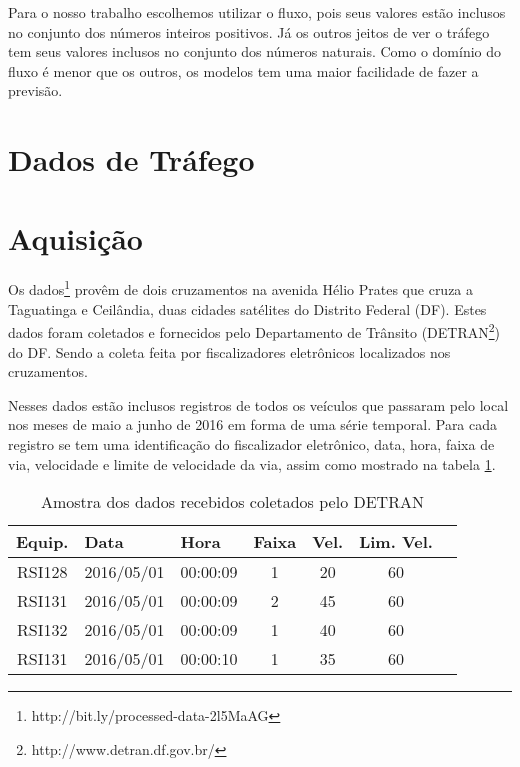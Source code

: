 Para o nosso trabalho escolhemos utilizar o fluxo, pois seus valores estão inclusos no conjunto dos números inteiros positivos. Já os outros jeitos de ver o tráfego tem seus valores inclusos no conjunto dos números naturais. Como o domínio do fluxo é menor que os outros, os modelos tem uma maior facilidade de fazer a previsão.

\section{Dados de Tráfego}

\section{Aquisição}

Os dados\footnote{http://bit.ly/processed-data-2l5MaAG} provêm de dois cruzamentos na avenida Hélio Prates que cruza a Taguatinga e Ceilândia, duas cidades satélites do Distrito Federal (DF). Estes dados foram coletados e fornecidos pelo Departamento de Trânsito (DETRAN\footnote{http://www.detran.df.gov.br/}) do DF. Sendo a coleta feita por fiscalizadores eletrônicos localizados nos cruzamentos.

Nesses dados estão inclusos registros de todos os veículos que passaram pelo local nos meses de maio a junho de 2016 em forma de uma série temporal. Para cada registro se tem uma identificação do fiscalizador eletrônico, data, hora, faixa de via, velocidade e limite de velocidade da via, assim como mostrado na tabela \ref{table:sampleDETRAN}.

\begin{table}[h]
    \caption{Amostra dos dados recebidos coletados pelo DETRAN}
    \label{table:sampleDETRAN}
    \begin{center}
    \begin{tabular}{ccccccc}
    \hline
    \multicolumn{1}{l}{\textbf{Equip.}} & \multicolumn{1}{l}{\textbf{Data}} & \multicolumn{1}{l}{\textbf{Hora}} & \multicolumn{1}{l}{\textbf{Faixa}} & \multicolumn{1}{l}{\textbf{Vel.}} & \multicolumn{1}{l}{\textbf{Lim. Vel.}}\\ 
    \hline
    RSI128 & 2016/05/01 & 00:00:09 & 1 & 20 & 60 \\
    RSI131 & 2016/05/01 & 00:00:09 & 2 & 45 & 60 \\
    RSI132 & 2016/05/01 & 00:00:09 & 1 & 40 & 60 \\
    RSI131 & 2016/05/01 & 00:00:10 & 1 & 35 & 60 \\ 
    \hline
    \end{tabular}
    \end{center}
\end{table}